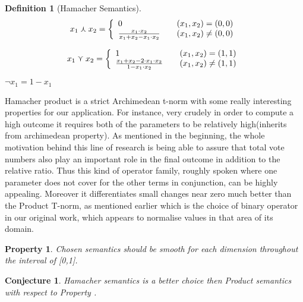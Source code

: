 \documentclass{article}
\newtheorem{definition}{Definition}
\newtheorem{property}{Property}
\newtheorem{conjecture}{Conjecture}
\begin{document}
\begin{definition} [Hamacher Semantics]

\[  x_{1}\curlywedge x_{2}= \left\{ 
  \begin{array}{l l}
    0 & \quad ( x_{1},  x_{2}) = (0, 0)\\
    \frac{ x_{1}\cdot  x_{2}}{ x_{1}+ x_{2}- x_{1}\cdot  x_{2}} & \quad  ( x_{1},  x_{2}) \neq (0, 0)
  \end{array} \right.\]

\[  x_{1}\curlyvee x_{2}= \left\{ 
  \begin{array}{l l}
    1 & \quad ( x_{1},  x_{2}) = (1, 1)\\
    \frac{x_{1}+  x_{2} - 2 \cdot x_{1} \cdot x_{2}}{1- x_{1}\cdot  x_{2}} & \quad  ( x_{1},  x_{2}) \neq (1, 1)
  \end{array} \right.\]

\begin{center}
$\lnot x_{1}=1-x_{1}$
\end{center}
\end{definition}

Hamacher product is a strict Archimedean t-norm with some really interesting properties for our application. For instance, very crudely in order to compute a high outcome it requires both of the parameters to be relatively high(inherits from archimedean property). As mentioned in the beginning, the whole motivation behind this line of research is being able to assure that total vote numbers also play an important role in the final outcome in addition to the relative ratio. Thus this kind of operator family, roughly spoken where  one parameter does not cover for the other terms in conjunction,  can be highly appealing. Moreover it differentiates small changes near zero much better than the Product T-norm, as mentioned earlier which is the choice of binary operator in our original work, which appears to normalise values in that area of its domain.

\begin{property}
Chosen semantics should be smooth for each dimension throughout the interval of [0,1].
\end{property}

\begin{conjecture}
Hamacher semantics is a better choice then Product semantics with respect to Property .
\end{conjecture}
\end{document}
